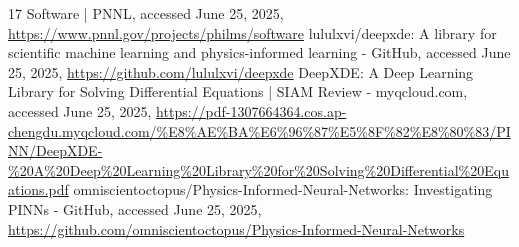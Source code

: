 \documentclass{article}
\begin{document}
\begin{thebibliography}{17}
     Software | PNNL, accessed June 25, 2025, \url{https://www.pnnl.gov/projects/philms/software}
     lululxvi/deepxde: A library for scientific machine learning and physics-informed learning - GitHub, accessed June 25, 2025, \url{https://github.com/lululxvi/deepxde}
     DeepXDE: A Deep Learning Library for Solving Differential Equations | SIAM Review - myqcloud.com, accessed June 25, 2025, \url{https://pdf-1307664364.cos.ap-chengdu.myqcloud.com/%E8%AE%BA%E6%96%87%E5%8F%82%E8%80%83/PINN/DeepXDE-%20A%20Deep%20Learning%20Library%20for%20Solving%20Differential%20Equations.pdf}
     omniscientoctopus/Physics-Informed-Neural-Networks: Investigating PINNs - GitHub, accessed June 25, 2025, \url{https://github.com/omniscientoctopus/Physics-Informed-Neural-Networks}
\end{thebibliography}
\end{document}
